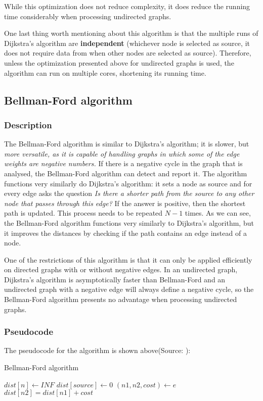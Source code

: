 \documentclass[runningheads]{llncs}
\begin{document}
While this optimization does not reduce complexity, it does reduce the running time considerably when processing undirected graphs.

One last thing worth mentioning about this algorithm is that the multiple runs of Dijkstra's algorithm are \textbf{independent} (whichever node is selected as source, it does not require data from when other nodes are selected as source). Therefore, unless the optimization presented above for undirected graphs is used, the algorithm can run on multiple cores, shortening its running time.

\subsection{Bellman-Ford algorithm}
\subsubsection{Description}
The Bellman-Ford algorithm is similar to Dijkstra's algorithm; it is slower, but \textit{more versatile, as it is capable of handling graphs in which some of the edge weights are negative numbers.}\cite{ref_url_BF} If there is a negative cycle in the graph that is analysed, the Bellman-Ford algorithm can detect and report it. The algorithm functions very similarly do Dijkstra's algorithm: it sets a node as source and for every edge asks the question \textit{Is there a shorter path from the source to any other node that passes through this edge?} If the answer is positive, then the shortest path is updated. This process needs to be repeated $N-1$ times. As we can see, the Bellman-Ford algorithm functions very similarly to Dijkstra's algorithm, but it improves the distances by checking if the path contains an edge instead of a node.

One of the restrictions of this algorithm is that it can only be applied efficiently on directed graphs with or without negative edges. In an undirected graph, Dijkstra's algorithm is asymptotically faster than Bellman-Ford and an undirected graph with a negative edge will always define a negative cycle, so the Bellman-Ford algorithm presents no advantage when processing undirected graphs.

\subsubsection{Pseudocode}
The pseudocode for the algorithm is shown above(Source: \cite{ref_url_BF}):
\begin{algorithm}
\caption{Bellman-Ford algorithm}\label{algBF:cap}
\begin{algorithmic}[1]
	\State $dist[n] \gets INF$
\EndFor
\State $dist[source] \gets 0$
		\State $(n1, n2, cost) \gets e$
			\State $dist[n2] = dist[n1] + cost$
		\EndIf
	\EndFor
\EndFor
\end{algorithmic}
\end{algorithm}
\end{document}
